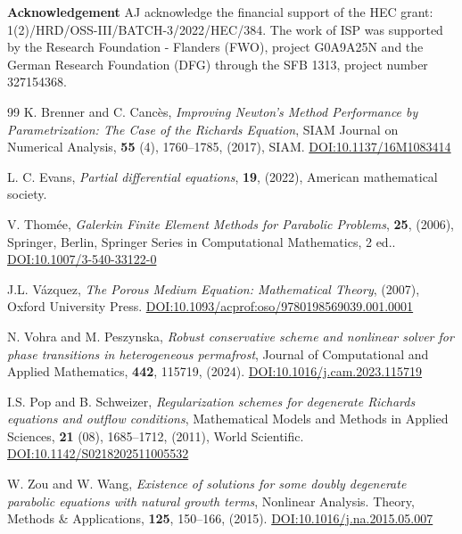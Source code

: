 \documentclass[review,11pt]{article}
\numberwithin{equation}{section}
\begin{document}
\textbf{Acknowledgement} AJ acknowledge the financial support of the  HEC grant: 1(2)/HRD/OSS-III/BATCH-3/2022/HEC/384. The work of ISP was supported by the Research Foundation - Flanders (FWO), project G0A9A25N and the German Research Foundation (DFG) through the SFB 1313, project number 327154368.

%
%

\begin{thebibliography}{99}
K. Brenner and C. Canc{\`e}s, \emph{Improving {N}ewton's {Method Performance} by {Parametrization}: {The Case} of the {R}ichards {Equation}}, SIAM Journal on Numerical Analysis, \textbf{55} (4), 1760--1785, (2017), SIAM. \href{https://doi.org/10.1137/16M1083414}
{DOI:10.1137/16M1083414}

L. C. Evans, \emph{Partial differential equations}, \textbf{19}, (2022), American mathematical society.

V. Thom{\'e}e, \emph{Galerkin Finite Element Methods for Parabolic Problems}, \textbf{25}, (2006), Springer, Berlin, Springer Series in Computational Mathematics, 2 ed.. \href{https://doi.org/10.1007/3-540-33122-0}{DOI:10.1007/3-540-33122-0}

J.L. V{\'a}zquez, \emph{{The Porous Medium Equation: Mathematical Theory}}, (2007), Oxford University Press. \href{https://doi.org/10.1093/acprof:oso/9780198569039.001.0001}{DOI:10.1093/acprof:oso/9780198569039.001.0001}

N. Vohra and M. Peszynska, \emph{Robust conservative scheme and nonlinear solver for phase transitions in heterogeneous permafrost}, Journal of Computational and Applied Mathematics, \textbf{442}, 115719, (2024). \href{https://doi.org/10.1016/j.cam.2023.115719}
{DOI:10.1016/j.cam.2023.115719}

I.S. Pop and B. Schweizer, \emph{Regularization schemes for degenerate {R}ichards equations and outflow conditions}, Mathematical Models and Methods in Applied Sciences, \textbf{21} (08), 1685--1712, (2011), World Scientific. \href{https://doi.org/10.1142/S0218202511005532}{DOI:10.1142/S0218202511005532}

W. Zou and W. Wang, \emph{Existence of solutions for some doubly degenerate parabolic
equations with natural growth terms}, Nonlinear Analysis. Theory, Methods \& Applications, \textbf{125}, 150--166, (2015). \href{https://doi.org/10.1016/j.na.2015.05.007}
{DOI:10.1016/j.na.2015.05.007}



\end{thebibliography}
\end{document}
